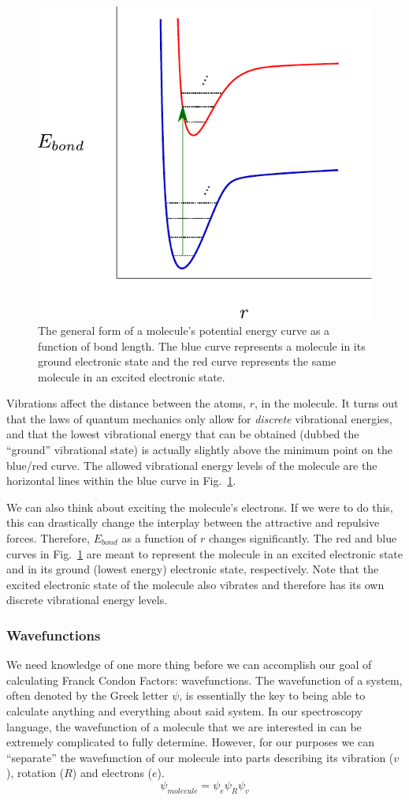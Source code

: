 \documentclass[12pt]{article}
\begin{document}
\begin{figure}
    \begin{center}
        \includegraphics[width=0.4\linewidth]{figures/potential_energy_curve.pdf}
    \end{center}
    \caption{
        The general form of a molecule's potential energy curve as a function of bond length. The blue curve represents a molecule in its ground electronic state and the red curve represents the same molecule in an excited electronic state.
    }
    \label{fig:potential_curve}
\end{figure}

Vibrations affect the distance between the atoms, $r$, in the molecule. It turns out that the laws of quantum mechanics only allow for \textit{discrete} vibrational energies, and that the lowest vibrational energy that can be obtained (dubbed the ``ground'' vibrational state) is actually slightly above the minimum point on the blue/red curve. The allowed vibrational energy levels of the molecule are the horizontal lines within the blue curve in Fig.~\ref{fig:potential_curve}.

We can also think about exciting the molecule's electrons. If we were to do this, this can drastically change the interplay between the attractive and repulsive forces. Therefore, $E_{bond}$ as a function of $r$ changes significantly. The red and blue curves in Fig.~\ref{fig:potential_curve} are meant to represent the molecule in an excited electronic state and in its ground (lowest energy) electronic state, respectively. Note that the excited electronic state of the molecule also vibrates and therefore has its own discrete vibrational energy levels.

\subsubsection{Wavefunctions}

We need knowledge of one more thing before we can accomplish our goal of calculating Franck Condon Factors: wavefunctions. The wavefunction of a system, often denoted by the Greek letter $\psi$, is essentially the key to being able to calculate anything and everything about said system. In our spectroscopy language, the wavefunction of a molecule that we are interested in can be extremely complicated to fully determine. However, for our purposes we can ``separate'' the wavefunction of our molecule into parts describing its vibration ($v$), rotation ($R$) and electrons ($e$).
\begin{equation}
    \psi_{molecule} = \psi_e\psi_R\psi_v
\end{equation}
\end{document}
